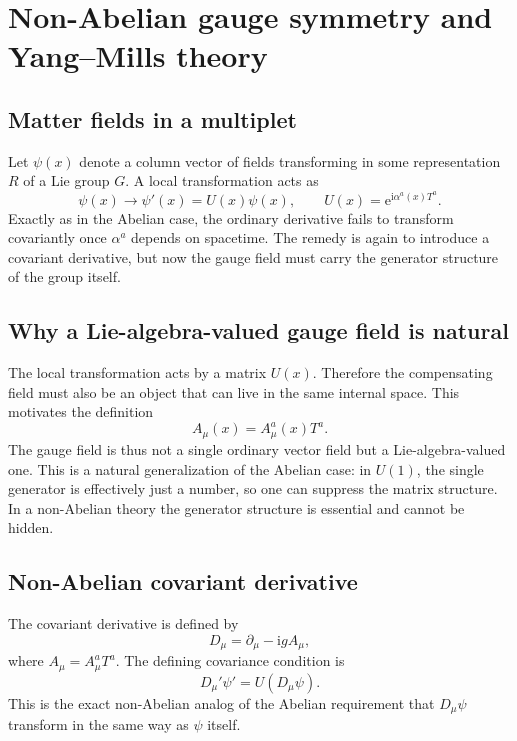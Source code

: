 \documentclass[11pt,a4paper]{article}
\newcommand{\ii}{\mathrm{i}}
\newcommand{\ee}{\mathrm{e}}
\newcommand{\p}{\partial}
\begin{document}
\section{Non-Abelian gauge symmetry and Yang--Mills theory}

\subsection{Matter fields in a multiplet}

Let \(\psi(x)\) denote a column vector of fields transforming in some representation \(R\) of a Lie group \(G\). A local transformation acts as
\begin{equation}
\psi(x)\to \psi'(x)=U(x)\psi(x),
\qquad
U(x)=\ee^{\ii\alpha^a(x)T^a}.
\label{eq:local-multiplet-transform-expanded}
\end{equation}
Exactly as in the Abelian case, the ordinary derivative fails to transform covariantly once \(\alpha^a\) depends on spacetime. The remedy is again to introduce a covariant derivative, but now the gauge field must carry the generator structure of the group itself.

\subsection{Why a Lie-algebra-valued gauge field is natural}

The local transformation acts by a matrix \(U(x)\). Therefore the compensating field must also be an object that can live in the same internal space. This motivates the definition
\begin{equation}
A_\mu(x)=A_\mu^a(x)T^a.
\label{eq:lie-algebra-valued-gauge-field}
\end{equation}
The gauge field is thus not a single ordinary vector field but a Lie-algebra-valued one. This is a natural generalization of the Abelian case: in \(U(1)\), the single generator is effectively just a number, so one can suppress the matrix structure. In a non-Abelian theory the generator structure is essential and cannot be hidden.

\subsection{Non-Abelian covariant derivative}

The covariant derivative is defined by
\begin{equation}
D_\mu = \p_\mu-\ii gA_\mu,
\label{eq:nonabelian-covariant-derivative-expanded}
\end{equation}
where \(A_\mu=A_\mu^aT^a\). The defining covariance condition is
\begin{equation}
D_\mu'\psi' = U(D_\mu\psi).
\label{eq:nonabelian-covariance-demand}
\end{equation}
This is the exact non-Abelian analog of the Abelian requirement that \(D_\mu\psi\) transform in the same way as \(\psi\) itself.
\end{document}
